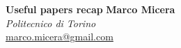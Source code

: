 \Large{\textbf{Useful papers recap}} \hfill \large{\textbf{Marco Micera}} \\
\normalsize \phantom{Notes on papers that might be useful} \hfill \textit{Politecnico di Torino} \\
\normalsize \phantom{for the development of this thesis} \hfill \href{mailto:marco.micera@gmail.com}{marco.micera@gmail.com}
